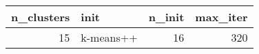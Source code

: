 \begin{tabular}{rlrr}
\toprule
n_clusters & init & n_init & max_iter \\
\midrule
15 & k-means++ & 16 & 320 \\
\bottomrule
\end{tabular}
